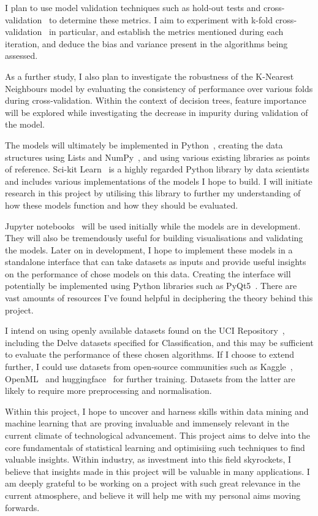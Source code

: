 \documentclass[report,10pt]{article}
\begin{document}
I plan to use model validation techniques such as hold-out tests and cross-validation~\cite{crossvalidationKohavi} to determine these metrics. I aim to experiment with k-fold cross-validation~\cite[p.241-249]{tEoSLHastie} in particular, and establish the metrics mentioned during each iteration, and deduce the bias and variance present in the algorithms being assessed. \par
As a further study, I also plan to investigate the robustness of the K-Nearest Neighbours model by evaluating the consistency of performance over various folds during cross-validation. Within the context of decision trees, feature importance will be explored while investigating the decrease in impurity during validation of the model. \par

The models will ultimately be implemented in Python~\cite{python3}, creating the data structures using Lists and NumPy~\cite{numpy}, and using various existing libraries as points of reference. Sci-kit Learn~\cite{scikit-learn} is a highly regarded Python library by data scientists and includes various implementations of the models I hope to build. I will initiate research in this project by utilising this library to further my understanding of how these models function and how they should be evaluated. \par
Jupyter notebooks~\cite{jupyter} will be used initially while the models are in development. They will also be tremendously useful for building visualisations and validating the models. Later on in development, I hope to implement these models in a standalone interface that can take datasets as inputs and provide useful insights on the performance of chose models on this data. Creating the interface will potentially be implemented using Python libraries such as PyQt5~\cite{pyqt5}. There are vast amounts of resources I've found helpful in deciphering the theory behind this project. \par
I intend on using openly available datasets found on the UCI Repository~\cite{uci}, including the Delve datasets specified for Classification, and this may be sufficient to evaluate the performance of these chosen algorithms. If I choose to extend further, I could use datasets from open-source communities such as Kaggle~\cite{kaggle}, OpenML~\cite{OpenML2013} and huggingface~\cite{huggingface} for further training. Datasets from the latter are likely to require more preprocessing and normalisation.  \par
Within this project, I hope to uncover and harness skills within data mining and machine learning that are proving invaluable and immensely relevant in the current climate of technological advancement. This project aims to delve into the core fundamentals of statistical learning and optimisiing such techniques to find valuable insights. Within industry, as investment into this field skyrockets, I believe that insights made in this project will be valuable in many applications. I am deeply grateful to be working on a project with such great relevance in the current atmosphere, and believe it will help me with my personal aims moving forwards. 
\end{document}
